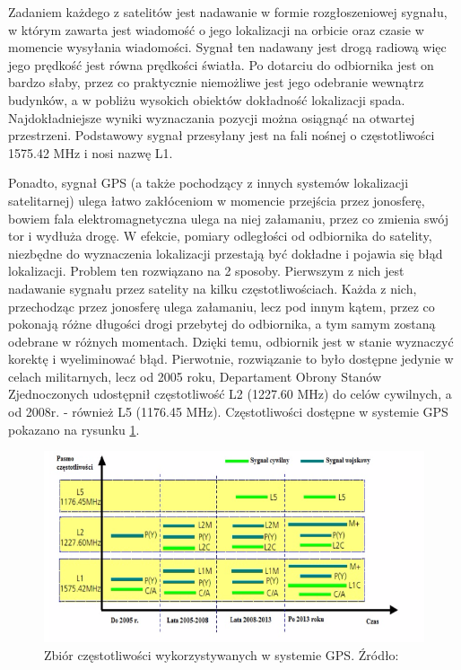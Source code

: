 Zadaniem każdego z satelitów jest nadawanie w formie rozgłoszeniowej sygnału, w którym zawarta jest wiadomość o jego lokalizacji na orbicie oraz czasie w momencie wysyłania wiadomości. Sygnał ten nadawany jest drogą radiową więc jego prędkość jest równa prędkości światła. Po dotarciu do odbiornika jest on bardzo słaby, przez co praktycznie niemożliwe jest jego odebranie wewnątrz budynków, a w pobliżu wysokich obiektów dokładność lokalizacji spada. Najdokładniejsze wyniki wyznaczania pozycji można osiągnąć na otwartej przestrzeni. Podstawowy sygnał przesyłany jest na fali nośnej o częstotliwości 1575.42 MHz i nosi nazwę L1.

Ponadto, sygnał GPS (a także pochodzący z innych systemów lokalizacji satelitarnej) ulega łatwo zakłóceniom w momencie przejścia przez jonosferę, bowiem fala elektromagnetyczna ulega na niej załamaniu, przez co zmienia swój tor i wydłuża drogę. W efekcie, pomiary odległości od odbiornika do satelity, niezbędne do wyznaczenia lokalizacji przestają być dokładne i pojawia się błąd lokalizacji.
Problem ten rozwiązano na 2 sposoby. Pierwszym z nich jest nadawanie sygnału przez satelity na kilku częstotliwościach. Każda z nich, przechodząc przez jonosferę ulega załamaniu, lecz pod innym kątem, przez co pokonają różne długości drogi przebytej do odbiornika, a tym samym zostaną odebrane w różnych momentach. Dzięki temu, odbiornik jest w stanie wyznaczyć korektę i wyeliminować błąd. Pierwotnie, rozwiązanie to było dostępne jedynie w celach militarnych, lecz od 2005 roku, Departament Obrony Stanów Zjednoczonych udostępnił częstotliwość L2 (1227.60 MHz) do celów cywilnych, a od 2008r. - również L5 (1176.45 MHz). Częstotliwości dostępne w systemie GPS pokazano na rysunku \ref{fig:image_gps_frequencies}.

\begin{figure}[H]
	\centering
	\includegraphics[width=15cm]{img/theory/GPS/gps_frequencies.png}
	\caption{Zbiór częstotliwości wykorzystywanych w systemie GPS. Źródło: \cite{inzynierka}}
	\label{fig:image_gps_frequencies}
\end{figure}

